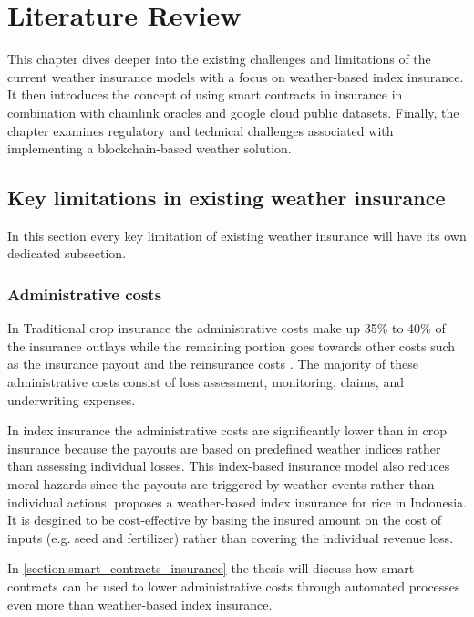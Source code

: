 \chapter{Literature Review}\label{chapter:literature_review}

This chapter dives deeper into the existing challenges and limitations of the current weather insurance models with a focus on weather-based index insurance. It then introduces the concept of using smart contracts in insurance in combination with chainlink oracles and google cloud public datasets. Finally, the chapter examines regulatory and technical challenges associated with implementing a blockchain-based weather solution. 

\section{Key limitations in existing weather insurance}\label{section:key_limitations_existing_insurance}

In this section every key limitation of existing weather insurance will have its own dedicated subsection.

\subsection{Administrative costs}

In Traditional crop insurance the administrative costs make up 35\% to 40\% of the insurance outlays while the remaining portion goes towards other costs such as the insurance payout and the reinsurance costs \autocite{glauber2004crop}. The majority of these administrative costs consist of loss assessment, monitoring, claims, and underwriting expenses.

In index insurance the administrative costs are significantly lower than in crop insurance because the payouts are based on predefined weather indices rather than assessing individual losses. This index-based insurance model also reduces moral hazards since the payouts are triggered by weather events rather than individual actions. \autocite{kusuma2018viable} proposes a weather-based index insurance for rice in Indonesia. It  is desgined to be cost-effective by basing the insured amount on the cost of inputs (e.g. seed and fertilizer) rather than covering the individual revenue loss.

In \cref{section:smart_contracts_insurance} the thesis will discuss how smart contracts can be used to lower administrative costs through automated processes even more than weather-based index insurance.

